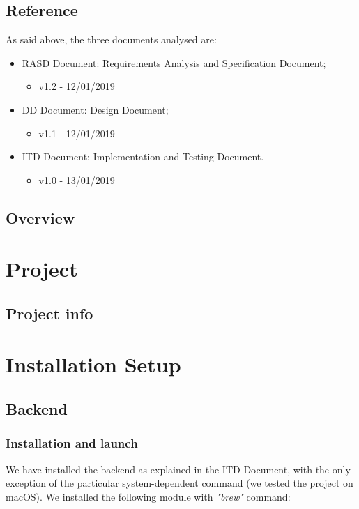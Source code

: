 \documentclass{article}
\begin{document}
\subsection{Reference} 
	As said above, the three documents analysed are:
	\begin{itemize}
		\item RASD Document: Requirements Analysis and Specification Document;
		\begin{itemize}			\item v1.2 - 12/01/2019		\end{itemize}	
		\item DD Document: Design Document;
		\begin{itemize}			\item v1.1 - 12/01/2019		\end{itemize}	
		\item ITD Document: Implementation and Testing Document.
		\begin{itemize}			\item v1.0 - 13/01/2019		\end{itemize}	
	\end{itemize}
\subsection{Overview} 

\newpage
\section{Project}
\subsection{Project info}

\newpage
\section{Installation Setup}
\subsection{Backend }
\subsubsection{Installation and launch}
	We have installed the backend as explained in the ITD Document, with the only exception of the particular system-dependent command (we tested the project on macOS).\newline
	We installed the following module with \textit{"brew"} command:
	
\end{document}
